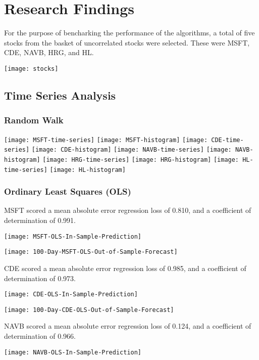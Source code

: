 \chapter{Research Findings}
For the purpose of bencharking the performance of the algorithms, a total of five stocks from the basket of uncorrelated stocks were selected. These were MSFT, CDE, NAVB, HRG, and HL. 

\texttt{[image: stocks]}

\section{Time Series Analysis}

\subsection{Random Walk}
\texttt{[image: MSFT-time-series]}
\texttt{[image: MSFT-histogram]}
\texttt{[image: CDE-time-series]}
\texttt{[image: CDE-histogram]}
\texttt{[image: NAVB-time-series]}
\texttt{[image: NAVB-histogram]}
\texttt{[image: HRG-time-series]}
\texttt{[image: HRG-histogram]}
\texttt{[image: HL-time-series]}
\texttt{[image: HL-histogram]}

\subsection{Ordinary Least Squares (OLS)}
MSFT scored a mean absolute error regression loss of 0.810, and a coefficient of determination of 0.991.

\texttt{[image: MSFT-OLS-In-Sample-Prediction]}

\texttt{[image: 100-Day-MSFT-OLS-Out-of-Sample-Forecast]}

CDE scored a mean absolute error regression loss of 0.985, and a coefficient of determination of 0.973.

\texttt{[image: CDE-OLS-In-Sample-Prediction]}

\texttt{[image: 100-Day-CDE-OLS-Out-of-Sample-Forecast]}

NAVB scored a mean absolute error regression loss of 0.124, and a coefficient of determination of 0.966.

\texttt{[image: NAVB-OLS-In-Sample-Prediction]}

